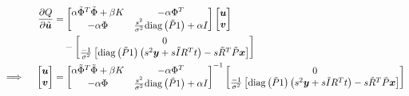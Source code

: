 \documentclass[10pt]{article}
\newcommand{\di}[2]{\frac{\partial#1}{\partial#2}}
\newcommand{\trans}[1]{#1^{T}}
\newcommand{\diag}{\mathrm{diag}}
\newcommand{\uvec}{\bm{u}}
\newcommand{\xvec}{\bm{x}}
\newcommand{\yvec}{\bm{y}}
\newcommand{\vvec}{\bm{v}}
\begin{document}
\begin{align}
    \di{Q}{\tilde{\uvec}} & = 
            \begin{bmatrix}
               \alpha\trans{\tilde{\Phi}}\tilde{\Phi}+\beta K & -\alpha\trans{\Phi}\\
               -\alpha\Phi & \frac{s^2}{\sigma^2}\diag\left(\tilde{P}1\right)+\alpha I
            \end{bmatrix}
            \begin{bmatrix}
               \uvec\\
               \vvec
           \end{bmatrix}\notag\\
           & \quad - \begin{bmatrix}
                       0\\
                       \frac{-1}{\sigma^2}\left[\diag\left(\tilde{P}1\right)\left(s^2\yvec+s\tilde{I}\trans{R}t\right)
                        -s\trans{\tilde{R}}\tilde{P}\xvec\right]
            \end{bmatrix}\notag\\
    \implies \quad 
        \begin{bmatrix}
            \uvec\\
            \vvec
        \end{bmatrix} & = 
            \begin{bmatrix}
               \alpha\trans{\tilde{\Phi}}\tilde{\Phi}+\beta K & -\alpha\trans{\Phi}\\
               -\alpha\Phi & \frac{s^2}{\sigma^2}\diag\left(\tilde{P}1\right)+\alpha I
            \end{bmatrix}^{-1}
            \begin{bmatrix}
                       0\\
                       \frac{-1}{\sigma^2}\left[\diag\left(\tilde{P}1\right)\left(s^2\yvec+s\tilde{I}\trans{R}t\right)
                        -s\trans{\tilde{R}}\tilde{P}\xvec\right]
            \end{bmatrix}
\end{align}
\end{document}

